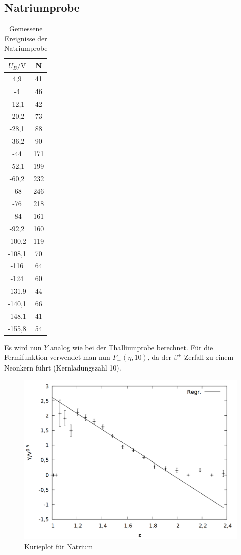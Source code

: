\subsection{Natriumprobe}
\begin{table}
\centering
\caption{Gemessene Ereignisse der Natriumprobe}
\begin{tabular}{cc}
\toprule
$U_B/\si{\volt}$ & N\\
\midrule
4,9&	41\\
-4&	46\\
-12,1&	42\\
-20,2&	73\\
-28,1&	88\\
-36,2&	90\\
-44&	171\\
-52,1&	199\\
-60,2&	232\\
-68&	246\\
-76&	218\\
-84&	161\\
-92,2&	160\\
-100,2&	119\\
-108,1&	70\\
-116&	64\\
-124&	60\\
-131,9&	44\\
-140,1&	66\\
-148,1&	41\\
-155,8&	54\\
\bottomrule
\end{tabular}
\label{tab:tl}
\end{table}

Es wird nun $Y$ analog wie bei der Thalliumprobe berechnet. Für die Fermifunktion verwendet man nun $F_+(\eta, 10)$, da der $\beta^+$-Zerfall zu einem Neonkern führt (Kernladungszahl 10).

\begin{figure}
\centering
\includegraphics[width=0.75\linewidth]{data/na.png}
\caption{Kurieplot für Natrium}
\label{fig:na}
\end{figure}


